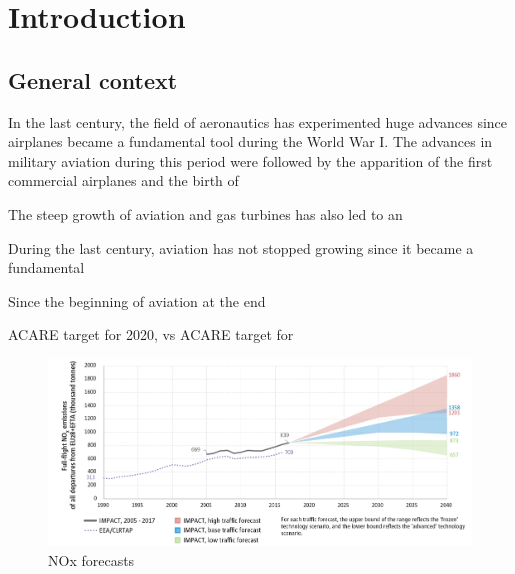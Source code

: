 \chapter{Introduction}
    

\section{General context}

In the last century, the field of aeronautics has experimented huge advances since airplanes became a fundamental tool during the World War I. The advances in military aviation during this period were followed by the apparition of the first commercial airplanes and the birth of  

The steep growth of aviation and gas turbines has also led to an 

During the last century, aviation has not stopped growing since it became a fundamental 

Since the beginning of aviation at the end


ACARE target for 2020, vs ACARE target for 


\begin{figure}[h!]
	\centering
	\includegraphics[scale=0.6]{./part0_intro/NOx_emissions_forecast_report2019}
	\caption{NOx forecasts }
	\label{fig:NOX_forecasts}
\end{figure}



